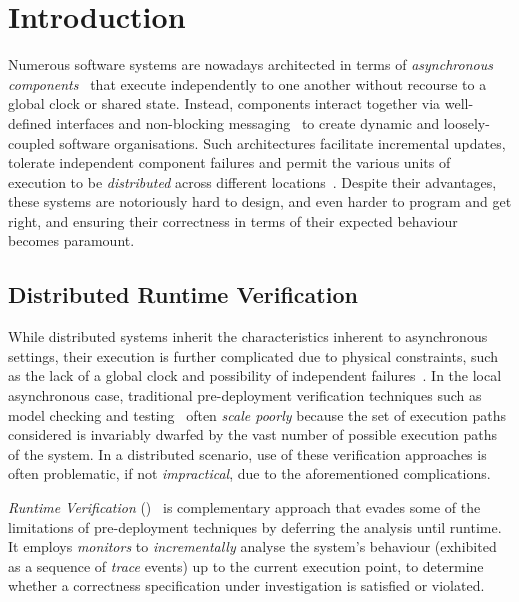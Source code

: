 \chapter{Introduction}\label{ch:introduction}

Numerous software systems are nowadays architected in terms of \emph{asynchronous components}~\cite{Chappell2004,Josuttis2007,AghaMST97} that execute independently to one another without recourse to a global clock or shared state.
%
Instead, components interact together via well-defined interfaces and non-blocking messaging~\cite{HohpeWoolf2003} to create dynamic and loosely-coupled software organisations.
%
Such architectures facilitate incremental updates, tolerate independent component failures and permit the various units of execution to be \emph{distributed} across different locations~\cite{Garg2014,DollimoreKindbergCoulouris2005}. 
%
Despite their advantages, these systems are notoriously hard to design, and even harder to program and get right, and ensuring their correctness in terms of their expected behaviour becomes paramount.

\section{Distributed Runtime Verification}

While distributed systems inherit the characteristics inherent to asynchronous settings, their execution is further complicated due to physical constraints, such as the lack of a global clock and possibility of independent failures~\cite{Ghosh2014,DollimoreKindbergCoulouris2005}.
%
In the local asynchronous case, traditional pre-deployment verification techniques such as model checking and testing~\cite{ClarkeGrumbergPeled1999,MyersSandlerBadgett2011} often \emph{scale poorly} because the set of execution paths considered is invariably dwarfed by the vast number of possible execution paths of the system.
%
In a distributed scenario, use of these verification approaches is often problematic, if not \emph{impractical}, due to the aforementioned complications. 

\emph{Runtime Verification} (\RV)~\cite{LeuckerS09,FalconeFM12} is complementary approach that evades some of the limitations of pre-deployment techniques by deferring the analysis until runtime.
%
It employs \emph{monitors}
%
to \emph{incrementally} analyse the system's behaviour (exhibited as a sequence of \emph{trace} events) up to the current execution point, to determine whether a correctness specification under investigation is satisfied or violated.

